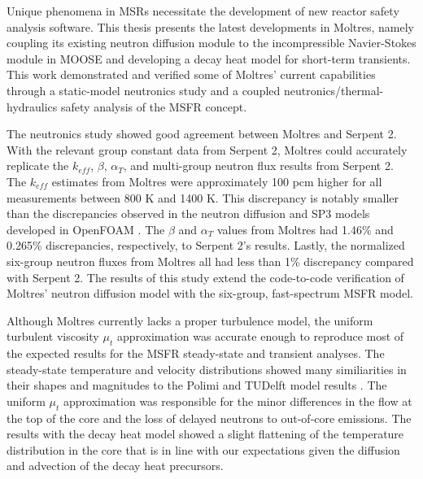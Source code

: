 Unique phenomena in \glspl{MSR} necessitate the development of new reactor
safety analysis software. This thesis presents the latest developments in
Moltres, namely coupling its existing neutron diffusion module to the
incompressible Navier-Stokes module in MOOSE and developing a decay heat model
for short-term transients. This work demonstrated and verified some of
Moltres' current capabilities through a static-model
neutronics study and a coupled neutronics/thermal-hydraulics safety analysis
of the \gls{MSFR} concept.

The neutronics study showed good agreement between Moltres and Serpent 2. With
the relevant group constant data from Serpent 2,
Moltres could accurately replicate the $k_{eff}$, $\beta$,
$\alpha_T$, and multi-group neutron flux results from Serpent 2. The
$k_{eff}$ estimates from Moltres were approximately 100 pcm higher for all
measurements between 800 K and 1400 K. This discrepancy is notably smaller
than the discrepancies observed in the neutron diffusion and SP3 models
developed in OpenFOAM \cite{aufiero_extended_2013}. The $\beta$ and $\alpha_T$
values from Moltres had 1.46\% and 0.265\% discrepancies, respectively, to
Serpent 2's results. Lastly, the normalized six-group neutron fluxes from
Moltres all had less than 1\% discrepancy compared with Serpent 2.
The results of this study extend
the code-to-code verification of Moltres'
neutron diffusion model with the six-group, fast-spectrum \gls{MSFR} model.

Although Moltres currently lacks a proper turbulence model, the uniform
turbulent viscosity $\mu_t$ approximation was accurate enough to reproduce
most of the expected results for the \gls{MSFR}
steady-state and transient analyses. The steady-state temperature and velocity
distributions showed many similiarities in their shapes and magnitudes to the
Polimi and TUDelft model results \cite{fiorina_modelling_2014}. The uniform
$\mu_t$ approximation was responsible for the minor differences in the flow at
the top of the core and the loss of delayed neutrons to out-of-core emissions.
The results with the decay heat model showed a slight flattening of the
temperature distribution in the core that is in line with our expectations
given the diffusion and advection of the decay heat precursors.

